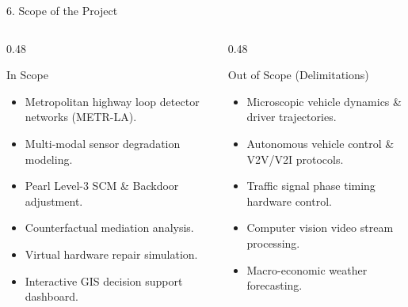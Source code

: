 \documentclass[aspectratio=169, 10pt]{beamer}
\begin{document}
\begin{frame}{6. Scope of the Project}
  \begin{columns}
    \begin{column}{0.48\textwidth}
      \begin{block}{In Scope}
        \begin{itemize}
          \item Metropolitan highway loop detector networks (METR-LA).
          \item Multi-modal sensor degradation modeling.
          \item Pearl Level-3 SCM \& Backdoor adjustment.
          \item Counterfactual mediation analysis.
          \item Virtual hardware repair simulation.
          \item Interactive GIS decision support dashboard.
        \end{itemize}
      \end{block}
    \end{column}
    \begin{column}{0.48\textwidth}
      \begin{alertblock}{Out of Scope (Delimitations)}
        \begin{itemize}
          \item Microscopic vehicle dynamics \& driver trajectories.
          \item Autonomous vehicle control \& V2V/V2I protocols.
          \item Traffic signal phase timing hardware control.
          \item Computer vision video stream processing.
          \item Macro-economic weather forecasting.
        \end{itemize}
      \end{alertblock}
    \end{column}
  \end{columns}
\end{frame}
\end{document}
